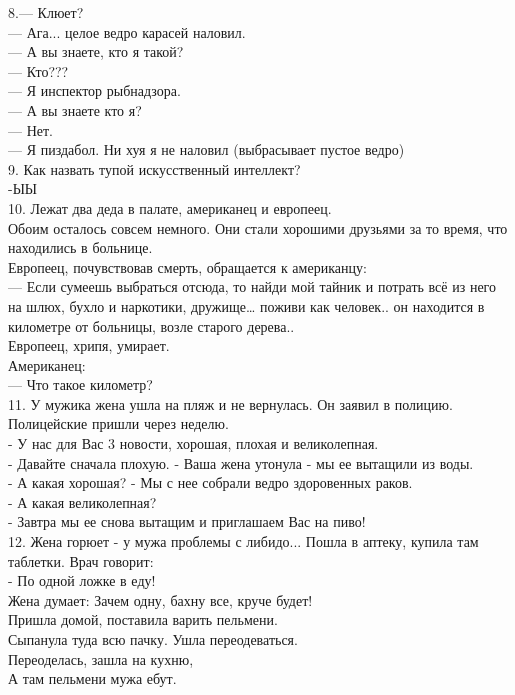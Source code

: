 \documentclass[a4paper,20pt,notitlepage]{extbook}
\begin{document}
	8.— Клюет?\\
	— Ага... целое ведро карасей наловил.\\
	— А вы знаете, кто я такой?\\
	— Кто???\\
	— Я инспектор рыбнадзора.\\
	— А вы знаете кто я?\\
	— Нет.\\
	— Я пиздабол. Ни хуя я не наловил (выбрасывает пустое ведро)\\
	
	9. Как назвать тупой искусственный интеллект?\\
	-ЫЫ\\
	
	10. Лежат два деда в палате, американец и европеец.\\ Обоим осталось совсем немного. Они стали хорошими друзьями за то время, что находились в больнице.\\
	Европеец, почувствовав смерть, обращается к американцу:\\
	— Если сумеешь выбраться отсюда, то найди мой тайник и потрать всё из него на шлюх, бухло и наркотики, дружище…
	 поживи как человек.. он находится в километре от больницы, возле старого дерева..\\
	Европеец, хрипя, умирает.\\
	Американец:\\
	— Что такое километр?\\
	
	11. У мужика жена ушла на пляж и не вернулась. Он заявил в полицию.\\
	Полицейские пришли через неделю.\\
	- У нас для Вас 3 новости, хорошая, плохая и великолепная.\\
	- Давайте сначала плохую. - Ваша жена утонула - мы ее вытащили из воды.\\
	- А какая хорошая? - Мы с нее собрали ведро здоровенных раков.\\
	- А какая великолепная? \\
	- Завтра мы ее снова вытащим и приглашаем Вас на пиво! \\
	
	12. Жена горюет - у мужа проблемы с либидо... Пошла в аптеку, купила там таблетки.
	Врач говорит:\\
	- По одной ложке в еду!\\
	Жена думает: Зачем одну, бахну все, круче будет!\\
	Пришла домой, поставила варить пельмени.\\
	Сыпанула туда всю пачку. Ушла переодеваться. \\
	Переоделась, зашла на кухню,\\
	А там пельмени мужа ебут.
	
\end{document}

